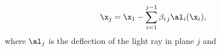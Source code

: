 \begin{equation}
\x_j=\x_1 - \sum\limits_{i=1}^{j-1} \beta_{i\,j} \al_i(\x_i),  
\label{eq:mp_full}
\end{equation}
where $\al_j$ is the deflection of the light ray in plane $j$ and
  